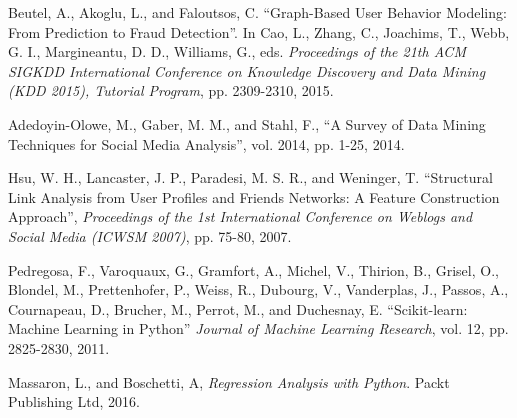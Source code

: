 \documentclass[conference]{csce}
\begin{document}
\begin{thebibliography}{1}
    Beutel, A., Akoglu, L., and Faloutsos, C. ``Graph-Based User Behavior Modeling: From Prediction to Fraud Detection''. In Cao, L., Zhang, C., Joachims, T., Webb, G. I., Margineantu, D. D., Williams, G., eds. \emph{Proceedings of the 21th ACM SIGKDD International Conference on Knowledge Discovery and Data Mining (KDD 2015), Tutorial Program}, pp. 2309-2310, 2015.
    
    Adedoyin-Olowe, M., Gaber, M. M., and Stahl, F., ``A Survey of Data Mining Techniques for Social Media Analysis'', vol. 2014, pp. 1-25, 2014.
    
    Hsu, W. H., Lancaster, J. P., Paradesi, M. S. R., and Weninger, T. ``Structural Link Analysis from User Profiles and Friends Networks: A Feature Construction Approach'', \emph{Proceedings of the 1st International Conference on Weblogs and Social Media (ICWSM 2007)}, pp. 75-80, 2007.

    Pedregosa, F., Varoquaux, G., Gramfort, A., Michel, V., Thirion, B., Grisel, O., Blondel, M., Prettenhofer, P., Weiss, R., Dubourg, V., Vanderplas, J., Passos, A., Cournapeau, D., Brucher, M., Perrot, M., and Duchesnay, E. ``Scikit-learn: Machine Learning in Python'' \emph{Journal of Machine Learning Research}, vol. 12, pp. 2825-2830, 2011.

	Massaron, L., and Boschetti, A, \emph{Regression Analysis with Python}. Packt Publishing Ltd, 2016.

\end{thebibliography}
\end{document}
